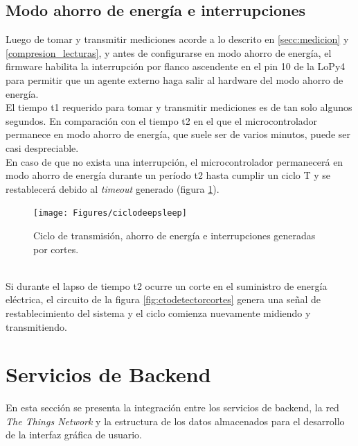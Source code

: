 \subsection{Modo ahorro de energía e interrupciones}
Luego de tomar y transmitir mediciones acorde a lo descrito en \ref{secc:medicion} y \ref{compresion_lecturas}, y antes de configurarse en modo ahorro de energía, el firmware habilita la interrupción por flanco ascendente en el pin 10 de la LoPy4 para permitir que un agente externo haga salir al hardware del modo ahorro de energ\'{i}a.\\
El tiempo t1 requerido para tomar y transmitir mediciones es de tan solo algunos segundos. En comparación con el tiempo t2 en el que el microcontrolador permanece en modo ahorro de energía, que suele ser de varios minutos, puede ser casi despreciable.\\ 
En caso de que no exista una interrupción, el microcontrolador permanecerá en modo ahorro de energía durante un per\'{i}odo t2 hasta cumplir un ciclo T y se restablecerá debido al \textit{timeout} generado (figura \ref{fig:ciclodeepsleep}).\\
\begin{figure}[h]
	\centering
	\texttt{[image: Figures/ciclodeepsleep]}
	\caption{Ciclo de transmisión, ahorro de energía e interrupciones generadas por cortes.}
	\label{fig:ciclodeepsleep}
\end{figure}\\
Si durante el lapso de tiempo t2 ocurre un corte en el suministro de energ\'{i}a el\'{e}ctrica, el circuito de la figura \ref{fig:ctodetectorcortes} genera una señal de restablecimiento del sistema y el ciclo comienza nuevamente midiendo y transmitiendo.\\


\section{Servicios de Backend}
\label{seccion_bes}
En esta sección se presenta la integración entre los servicios de backend, la red \textit{The Things Network} y la estructura de los datos almacenados para el desarrollo de la interfaz gráfica de usuario.\\
